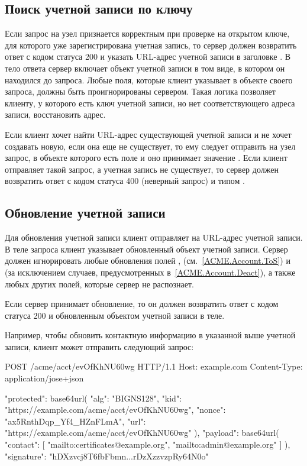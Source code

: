 \subsection{Поиск учетной записи по ключу} \label{ACME.Account.Find}

Если запрос на узел  признается корректным при проверке на 
открытом ключе, для которого уже зарегистрирована учетная запись, то сервер 
должен возвратить ответ с кодом статуса 200 и указать URL-адрес учетной
записи в заголовке . 
%
В тело ответа сервер включает объект учетной записи в том виде, в котором он 
находился до запроса.
%
Любые поля, которые клиент указывает в объекте своего запроса, должны быть 
проигнорированы сервером. Такая логика позволяет клиенту, у которого есть
ключ учетной записи, но нет соответствующего адреса записи, восстановить адрес.

Если клиент хочет найти URL-адрес существующей учетной записи и не хочет
создавать новую, если она еще не существует, то ему следует отправить 
на узел  запрос, в объекте которого есть 
поле  и оно принимает значение .
%
Если клиент отправляет такой запрос, а учетная запись не существует, то сервер
должен возвратить ответ с кодом статуса 400 (неверный запрос) и типом
.

\subsection{Обновление учетной записи}\label{ACME.Account.Upd}

Для обновления учетной записи клиент отправляет 
 на URL-адрес учетной записи. В теле 
запроса клиент указывает обновленный объект учетной записи.
%
Сервер должен игнорировать любые обновления полей , 
 (см.~\ref{ACME.Account.ToS}) и  
(за исключением случаев, предусмотренных в~\ref{ACME.Account.Deact}), 
а также любых других полей, которые сервер не распознает. 

Если сервер принимает обновление, то он должен возвратить ответ с кодом статуса 
200 и обновленным объектом учетной записи в теле. 

Например, чтобы обновить контактную информацию в указанной выше учетной записи, 
клиент может отправить следующий запрос:  

\begin{codeblock}
POST /acme/acct/evOfKhNU60wg HTTP/1.1
Host: example.com
Content-Type: application/jose+json

{
  "protected": base64url({
    "alg": "BIGNS128",
    "kid": "https://example.com/acme/acct/evOfKhNU60wg",
    "nonce": "ax5RnthDqp_Yf4_HZnFLmA",
    "url": "https://example.com/acme/acct/evOfKhNU60wg"
  }),
  "payload": base64url({
    "contact": [
      "mailto:certificates@example.org",
      "mailto:admin@example.org"
    ]
  }),
  "signature": "hDXzvcj8T6fbFbmn...rDzXzzvzpRy64N0o"
}
\end{codeblock}
\fi

